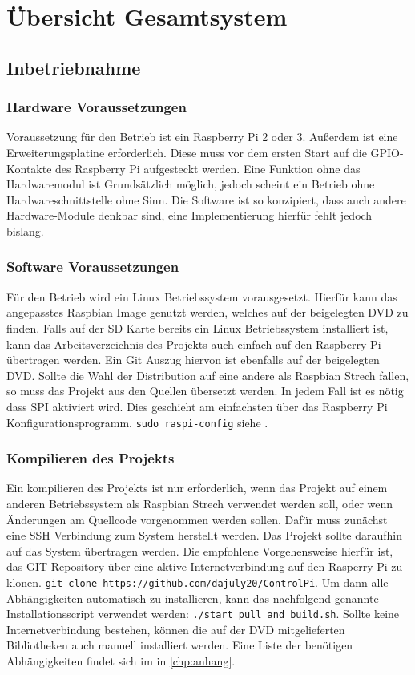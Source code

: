 \section{Übersicht Gesamtsystem}\label{kap:ausw}
 \subsection{Inbetriebnahme}
 \subsubsection{Hardware Voraussetzungen}
 Voraussetzung für den Betrieb ist ein Raspberry Pi 2 oder 3. Außerdem ist eine Erweiterungsplatine  erforderlich. Diese muss vor dem ersten Start auf die GPIO-Kontakte des Raspberry Pi aufgesteckt werden. Eine Funktion ohne das Hardwaremodul ist Grundsätzlich möglich, jedoch scheint ein Betrieb ohne Hardwareschnittstelle ohne Sinn. Die Software ist so konzipiert, dass auch andere Hardware-Module denkbar sind, eine Implementierung hierfür fehlt jedoch bislang.     
 \subsubsection{Software Voraussetzungen}
 Für den Betrieb wird ein Linux Betriebssystem vorausgesetzt. Hierfür kann das angepasstes Raspbian \cite{URL:Raspian} Image genutzt werden, welches auf der beigelegten DVD zu finden. Falls auf der SD Karte bereits ein Linux Betriebssystem installiert ist, kann das Arbeitsverzeichnis des Projekts auch einfach auf den Raspberry Pi übertragen werden. Ein Git Auszug hiervon ist ebenfalls auf der beigelegten DVD. Sollte die Wahl der Distribution auf eine andere als Raspbian Strech \cite{URL:Raspian} fallen, so muss das Projekt aus den Quellen übersetzt werden. In jedem Fall ist es nötig dass SPI aktiviert wird. Dies geschieht am einfachsten über das Raspberry Pi Konfigurationsprogramm.  \texttt{sudo raspi-config} siehe \cite{URL:EnableSPI}.  
 \subsubsection{Kompilieren des Projekts}
 Ein kompilieren des Projekts ist nur erforderlich, wenn das Projekt auf einem anderen Betriebssystem als Raspbian Strech \cite{URL:Raspian} verwendet werden soll, oder wenn Änderungen am Quellcode vorgenommen werden sollen. Dafür muss zunächst eine SSH Verbindung zum System herstellt werden. Das Projekt sollte daraufhin auf das System übertragen werden. Die empfohlene Vorgehensweise hierfür ist, das GIT Repository über eine aktive Internetverbindung auf den Rasperry Pi zu klonen. \texttt{git clone https://github.com/dajuly20/ControlPi}. Um dann alle Abhängigkeiten automatisch zu installieren, kann das nachfolgend genannte Installationsscript verwendet werden: \texttt{./start\_pull\_and\_build.sh}. Sollte keine Internetverbindung bestehen, können die auf der DVD mitgelieferten Bibliotheken auch manuell installiert werden. 
 Eine Liste der benötigen Abhängigkeiten findet sich im  in \autoref{chp:anhang}.  
